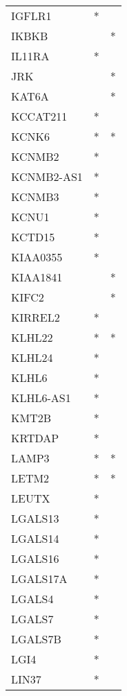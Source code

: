 \begin{longtable}{lcc}
IGFLR1       &         * &         \\
IKBKB        &           &       * \\
IL11RA       &         * &         \\
JRK          &           &       * \\
KAT6A        &           &       * \\
KCCAT211     &         * &         \\
KCNK6        &         * &       * \\
KCNMB2       &         * &         \\
KCNMB2-AS1   &         * &         \\
KCNMB3       &         * &         \\
KCNU1        &         * &         \\
KCTD15       &         * &         \\
KIAA0355     &         * &         \\
KIAA1841     &           &       * \\
KIFC2        &           &       * \\
KIRREL2      &         * &         \\
KLHL22       &         * &       * \\
KLHL24       &         * &         \\
KLHL6        &         * &         \\
KLHL6-AS1    &         * &         \\
KMT2B        &         * &         \\
KRTDAP       &         * &         \\
LAMP3        &         * &       * \\
LETM2        &         * &       * \\
LEUTX        &         * &         \\
LGALS13      &         * &         \\
LGALS14      &         * &         \\
LGALS16      &         * &         \\
LGALS17A     &         * &         \\
LGALS4       &         * &         \\
LGALS7       &         * &         \\
LGALS7B      &         * &         \\
LGI4         &         * &         \\
LIN37        &         * &         \\

\end{longtable}
